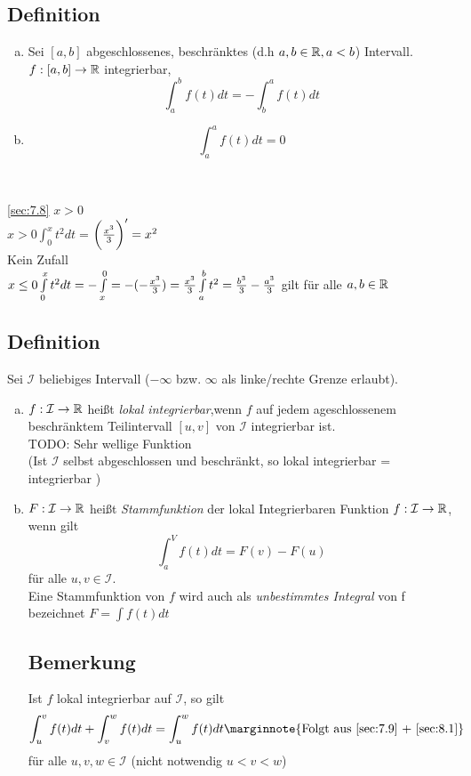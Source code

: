 \subsection{Definition}\label{sec:8.1}
\begin{enumerate}[a)]
	\item Sei $[a,b]$ abgeschlossenes, beschränktes (d.h $a,b \in \mathbb{R} , a < b$) Intervall.\\
	$f : [a,b] \to \mathbb{R}$ integrierbar,\\
	\[ \int_{a}^{b} f(t) dt = - \int_{b}^{a} f(t) dt \]
	\item \[ \int_{a}^{a} f(t) dt = 0 \]
\end{enumerate} \
\begin{table}[h!]
	\centering
	\begin{minipage}[t]{0.7\textwidth}
		\ref{sec:7.8} $x >0$\\
		$ x > 0 \int_{0}^{x} t^2 dt = $$ \\ \biggl(\frac{x^3}{3}\biggr)' = x^2$\\ Kein Zufall\\
		$x \le 0\\
		\int\limits_{0}^{x}t^2dt = - \int\limits_{x}^{0} = -(-\frac{x^3}{3}) = \frac{x^3}{3}\\
		\int\limits_{a}^{b}t^2 = \frac{b^3}{3} - \frac{a^3}{3}$ gilt für alle $a,b \in \mathbb{R}$
	\end{minipage}
\end{table} 
\subsection{Definition}
Sei $\mathcal{I}$ beliebiges Intervall ($-\infty$ bzw. $\infty$ als linke/rechte Grenze erlaubt).
\begin{enumerate}[a)]
	\item $f : \mathcal{I} \to \mathbb{R}$ hei\ss t \emph{lokal integrierbar},wenn $f$ auf jedem ageschlossenem beschränktem Teilintervall $[u,v]$ von $\mathcal{I}$ integrierbar ist.\\
	TODO: Sehr wellige Funktion\\
	(Ist $\mathcal{I}$ selbst abgeschlossen und beschränkt, so \glqq lokal integrierbar \glqq = \glqq integrierbar \glqq)
	\item $F : \mathcal{I} \to \mathbb{R} $ hei\ss t \emph{Stammfunktion} der lokal Integrierbaren Funktion $f : \mathcal{I} \to \mathbb{R} $, wenn gilt \[ \int_{a}^{V} f(t)dt = F(v) - F(u) \] für alle $u,v \in \mathcal{I}$.\\
	Eine Stammfunktion von $f$ wird auch als \emph{unbestimmtes Integral} von f bezeichnet $F = \int f(t)dt$
	\subsection{Bemerkung}
	Ist $f$ lokal integrierbar auf $\mathcal{I}$, so gilt \[ \int_{u}^{v}f(t)dt + \int_{v}^{w} f(t)dt = \int_{u}^{w} f(t)dt \marginnote{\text{Folgt aus \ref{sec:7.9} + \ref{sec:8.1}}} \] für alle $u,v,w \in \mathcal{I}$ (nicht notwendig $ u < v  <w$)
\end{enumerate}
